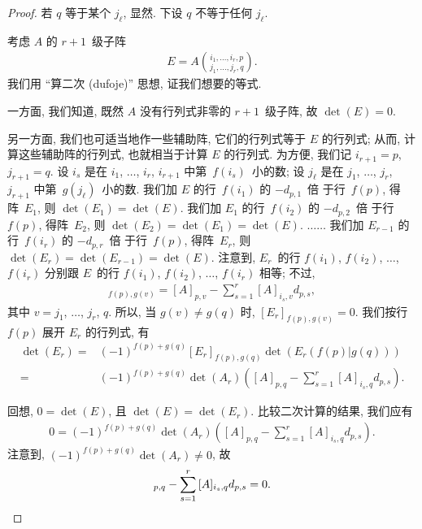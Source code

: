 \begin{proof}
    若 \(q\) 等于某个 \(j_\ell\), 显然.
    下设 \(q\) 不等于任何 \(j_\ell\).

    考虑 \(A\) 的 \(r+1\)~级子阵
    \begin{align*}
        E =
        A\binom{i_1,\dots,i_r,p}{j_1,\dots,j_r,q}.
    \end{align*}
    我们用 ``算二次 (dufoje)'' 思想,
    证我们想要的等式.

    一方面, 我们知道, 既然
    \(A\) 没有行列式非零的 \(r+1\)~级子阵,
    故 \(\det {(E)} = 0\).

    另一方面, 我们也可适当地作一些辅助阵,
    它们的行列式等于 \(E\) 的行列式;
    从而, 计算这些辅助阵的行列式,
    也就相当于计算 \(E\) 的行列式.
    为方便, 我们记
    \(i_{r+1} = p\),
    \(j_{r+1} = q\).
    设 \(i_s\) 是在
    \(i_1\), \(\dots\), \(i_r\), \(i_{r+1}\)
    中第~\(f(i_s)\)~小的数;
    设 \(j_\ell\) 是在
    \(j_1\), \(\dots\), \(j_r\), \(j_{r+1}\)
    中第~\(g(j_\ell)\)~小的数.
    我们加 \(E\) 的行~\(f(i_1)\) 的 \(-d_{p,1}\)~倍%
    于行~\(f(p)\),
    得阵~\(E_1\),
    则 \(\det {(E_1)} = \det {(E)}\).
    我们加 \(E_1\) 的行~\(f(i_2)\) 的 \(-d_{p,2}\)~倍%
    于行~\(f(p)\),
    得阵~\(E_2\),
    则 \(\det {(E_2)} = \det {(E_1)} = \det {(E)}\).
    \(\dots \dots\)
    我们加 \(E_{r-1}\) 的行~\(f(i_r)\) 的 \(-d_{p,r}\)~倍%
    于行~\(f(p)\),
    得阵~\(E_r\),
    则 \(\det {(E_r)} = \det {(E_{r-1})} = \det {(E)}\).
    注意到, \(E_r\)~的行
    \(f(i_1)\), \(f(i_2)\), \(\dots\), \(f(i_r)\)
    分别跟 \(E\)~的行
    \(f(i_1)\), \(f(i_2)\), \(\dots\), \(f(i_r)\)
    相等;
    不过,
    \begin{align*}
        [E_r]_{f(p),g(v)}
        = [A]_{p,v} -
        \sum_{s = 1}^{r}
        {[A]_{i_s,v} d_{p,s}},
    \end{align*}
    其中 \(v = j_1\), \(\dots\), \(j_r\), \(q\).
    所以, 当
    \(g(v) \neq g(q)\)
    时,
    \([E_r]_{f(p),g(v)} = 0\).
    我们按行~\(f(p)\) 展开 \(E_r\) 的行列式,
    有
    \begin{align*}
        \det {(E_r)}
        = {} &
        (-1)^{f(p)+g(q)} [E_r]_{f(p),g(q)}
        \det {(E_r (f(p)|g(q)))}
        \\
        = {} &
        (-1)^{f(p)+g(q)} \det {(A_r)}
        \left(
        [A]_{p,q} -
        \sum_{s = 1}^{r}
        {[A]_{i_s,q} d_{p,s}}
        \right).
    \end{align*}

    回想, \(0 = \det {(E)}\),
    且 \(\det {(E)} = \det {(E_r)}\).
    比较二次计算的结果, 我们应有
    \begin{align*}
        0 =
        (-1)^{f(p)+g(q)} \det {(A_r)}
        \left(
        [A]_{p,q} -
        \sum_{s = 1}^{r}
        {[A]_{i_s,q} d_{p,s}}
        \right).
    \end{align*}
    注意到,
    \((-1)^{f(p)+g(q)} \det {(A_r)} \neq 0\),
    故
    \begin{equation*}
        [A]_{p,q} -
        \sum_{s = 1}^{r}
        {[A]_{i_s,q} d_{p,s}} = 0.
        \qedhere
    \end{equation*}
\end{proof}

